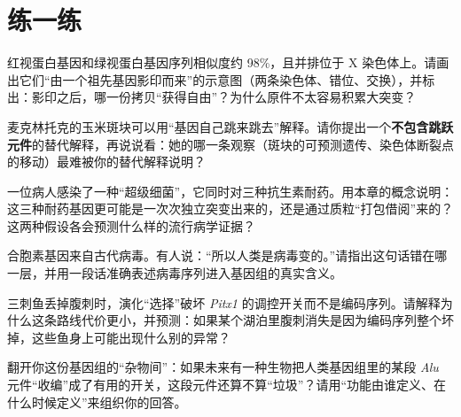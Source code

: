 \section*{练一练}

\begin{sikaoti}
\item 红视蛋白基因和绿视蛋白基因序列相似度约 98\%，且并排位于 X 染色体上。请画出它们“由一个祖先基因影印而来”的示意图（两条染色体、错位、交换），并标出：影印之后，哪一份拷贝“获得自由”？为什么原件不太容易积累大突变？
\item 麦克林托克的玉米斑块可以用“基因自己跳来跳去”解释。请你提出一个\textbf{不包含跳跃元件}的替代解释，再说说看：她的哪一条观察（斑块的可预测遗传、染色体断裂点的移动）最难被你的替代解释说明？
\item 一位病人感染了一种“超级细菌”，它同时对三种抗生素耐药。用本章的概念说明：这三种耐药基因更可能是一次次独立突变出来的，还是通过质粒“打包借阅”来的？这两种假设各会预测什么样的流行病学证据？
\item 合胞素基因来自古代病毒。有人说：“所以人类是病毒变的。”请指出这句话错在哪一层，并用一段话准确表述病毒序列进入基因组的真实含义。
\item 三刺鱼丢掉腹刺时，演化“选择”破坏 \emph{Pitx1} 的调控开关而不是编码序列。请解释为什么这条路线代价更小，并预测：如果某个湖泊里腹刺消失是因为编码序列整个坏掉，这些鱼身上可能出现什么别的异常？
\item 翻开你这份基因组的“杂物间”：如果未来有一种生物把人类基因组里的某段 \emph{Alu} 元件“收编”成了有用的开关，这段元件还算不算“垃圾”？请用“功能由谁定义、在什么时候定义”来组织你的回答。
\end{sikaoti}
